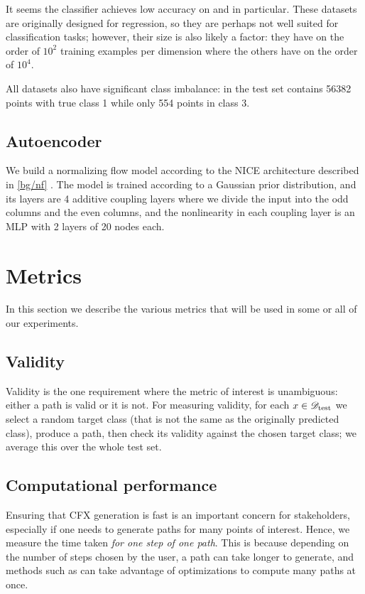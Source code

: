 \documentclass[../main.tex]{subfiles}
\begin{document}
It seems the classifier achieves low accuracy on \WineQuality{} and \OnlineNewsPopularity{} in particular.
These datasets are originally designed for regression, so they are perhaps not well suited for classification tasks; however, their size is also likely a factor: they have on the order of $10^2$ training examples per dimension where the others have on the order of $10^4$.

All datasets also have significant class imbalance: in \ForestCover{} the test set contains 56382 points with true class 1 while only 554 points in class 3.

\subsection{Autoencoder}

We build a normalizing flow model according to the NICE architecture described in \autoref{bg/nf} \cite{dinhNICE2015}.
The model is trained according to a Gaussian prior distribution, and its layers are 4 additive coupling layers where we divide the input into the odd columns and the even columns, and the nonlinearity in each coupling layer is an MLP with 2 layers of 20 nodes each.

\section{Metrics}

In this section we describe the various metrics that will be used in some or all of our experiments.

\subsection{Validity}

Validity is the one requirement where the metric of interest is unambiguous: either a path is valid or it is not.
For measuring validity, for each $x \in \mathscr{D}_\text{test}$ we select a random target class (that is not the same as the originally
predicted class), produce a path, then check its validity against the chosen target class; we average this over the whole
test set.

\subsection{Computational performance}

Ensuring that CFX generation is fast is an important concern for stakeholders, especially if one needs to generate paths for many points of interest.
Hence, we measure the time taken \emph{for one step of one path}.
This is because depending on the number of steps chosen by the user, a path can take longer to generate, and methods such as \ls{} can take advantage of optimizations to compute many paths at once.
\end{document}
